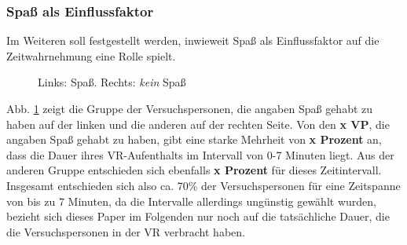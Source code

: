 \documentclass{Paper}
\begin{document}
       
     
      
\subsubsection{Spaß als Einflussfaktor}
Im Weiteren soll festgestellt werden, inwieweit Spaß als Einflussfaktor auf die Zeitwahrnehmung eine Rolle spielt.

\begin{figure}[H]
\caption{Links: Spaß. Rechts: \textit{kein} Spaß}
\label{Spass}
\end{figure} %

Abb. \ref{Spass} zeigt die Gruppe der Versuchspersonen, die angaben Spaß gehabt zu haben auf der linken und die anderen auf der rechten Seite. Von den \textbf{x VP}, die angaben Spaß gehabt zu haben, gibt eine starke Mehrheit von \textbf{x Prozent} an, dass die Dauer ihres VR-Aufenthalts im Intervall von 0-7 Minuten liegt. Aus der anderen Gruppe entschieden sich ebenfalls \textbf{x Prozent} für dieses Zeitintervall. Insgesamt entschieden sich also ca. 70\% der Versuchspersonen für eine Zeitspanne von bis zu 7 Minuten, da die Intervalle allerdings ungünstig gewählt wurden, bezieht sich dieses Paper im Folgenden nur noch auf die tatsächliche Dauer, die die Versuchspersonen in der VR verbracht haben.\\
\end{document}
